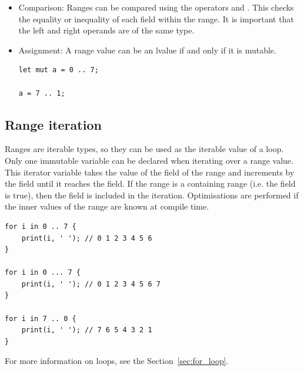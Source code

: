\begin{itemize}
\item Comparison: Ranges can be compared using the operators \token{==} and
  \token{!=}. This checks the equality or inequality of each field within the
  range. It is important that the left and right operands are of the same type.

\item Assignment: A range value can be an lvalue if and only if it is mutable.
  \begin{lstlisting}[style=coloredverbatim]
let mut a = 0 .. 7;

a = 7 .. 1;
  \end{lstlisting}

\end{itemize}

\subsection {Range iteration}

 Ranges are iterable types, so they can be used as the iterable value of a
  loop. Only one immutable variable can be declared when iterating
 over a range value. This iterator variable takes the value of the 
 field of the range and increments by the  field until it reaches
 the  field. If the range is a containing range (i.e. the
  field is true), then the  field is included in
 the iteration. Optimisations are performed if the inner values of the range are
 known at compile time.

\begin{lstlisting}[style=coloredverbatim]
for i in 0 .. 7 {
    print(i, ' '); // 0 1 2 3 4 5 6
}

for i in 0 ... 7 {
    print(i, ' '); // 0 1 2 3 4 5 6 7
}

for i in 7 .. 0 {
    print(i, ' '); // 7 6 5 4 3 2 1
}
\end{lstlisting}

For more information on  loops, see the Section~\ref{sec:for_loop}.

\vfill%
\pagebreak
